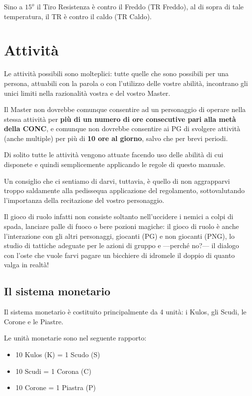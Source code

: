 Sino a $15^o$ il Tiro Resistenza \`e contro il Freddo (TR Freddo),
al di sopra di tale temperatura, il TR \`e contro il caldo (TR
Caldo).
\fi

\section{Attivit\`a}

Le attivit\`a possibili sono molteplici: tutte quelle che sono
possibili per una persona, attuabili con la parola o con l'utilizzo
delle vostre abilit\`a, incontrano gli unici limiti nella
razionalit\`a vostra e del vostro Master.

\iffullversion
Il Master non dovrebbe comunque consentire ad un personaggio di
operare nella stessa attivit\`a per \textbf{pi\`u di un numero di ore
  consecutive pari alla met\`a della CONC}, e comunque non dovrebbe
consentire ai PG di svolgere attivit\`a (anche multiple) per pi\`u di
\textbf{10 ore al giorno}, salvo che per brevi periodi.

Di solito tutte le attivit\`a vengono attuate facendo uso delle
abilit\`a di cui disponete e quindi semplicemente applicando le
regole di questo manuale.

Un consiglio che ci sentiamo di darvi, tuttavia, \`e quello di non
aggrapparvi troppo saldamente alla pedissequa applicazione del
regolamento, sottovalutando l'importanza della recitazione del vostro
personaggio.

Il gioco di ruolo infatti non consiste soltanto nell'uccidere i nemici
a colpi di spada, lanciare palle di fuoco o bere pozioni magiche: il
gioco di ruolo \`e anche l'interazione con gli altri personaggi,
giocanti (PG) e non giocanti (PNG), lo studio di tattiche adeguate per
le azioni di gruppo e ---perch\'e no?--- il dialogo con l'oste che vuole
farvi pagare un bicchiere di idromele il doppio di quanto valga in
realt\`a!
\fi

\subsection{Il sistema monetario}

Il sistema monetario \`e costituito principalmente da 4 unit\`a: i
Kulos, gli Scudi, le Corone e le Piastre.  

Le unit\`a monetarie sono nel seguente rapporto: 

\begin{itemize}
\itemsep -6pt
\item 10 Kulos (K) = 1 Scudo (S) 
\item 10 Scudi = 1 Corona (C) 
\item 10 Corone = 1 Piastra (P)
\end{itemize}

